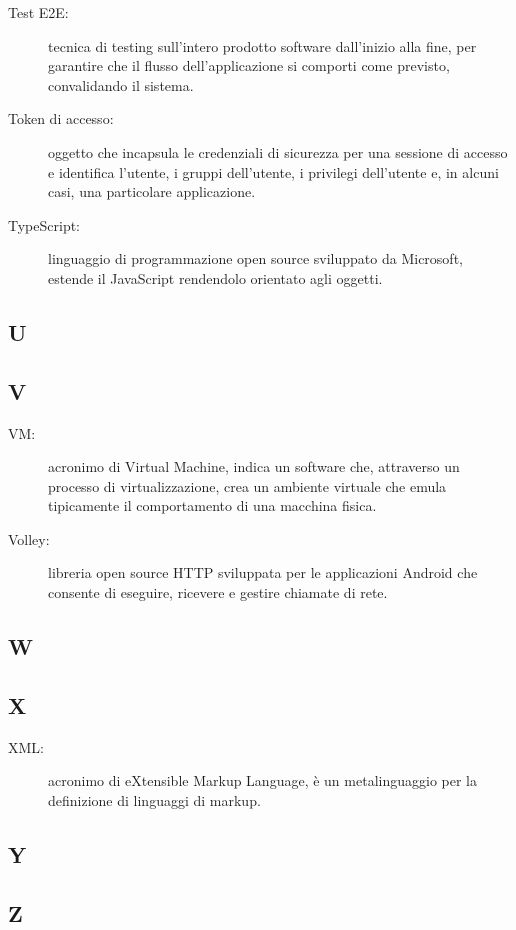 \documentclass[../manuale-manutentore.tex]{subfiles}
\begin{document}
\begin{description}
    \item[Test E2E:] tecnica di testing sull'intero prodotto software dall'inizio alla fine, per garantire che il flusso dell'applicazione si comporti come previsto, convalidando il sistema.
    \item[Token di accesso:] oggetto che incapsula le credenziali di sicurezza per una sessione di accesso e identifica l'utente, i gruppi dell'utente, i privilegi dell'utente e, in alcuni casi, una particolare applicazione.
    \item[TypeScript:] linguaggio di programmazione open source sviluppato da Microsoft, estende il JavaScript rendendolo orientato agli oggetti.
\end{description}

\subsection{U}

\subsection{V}

\begin{description}
    \item[VM:] acronimo di Virtual Machine, indica un software che, attraverso un processo di virtualizzazione, crea un ambiente virtuale che emula tipicamente il comportamento di una macchina fisica.
    \item[Volley:] libreria open source HTTP sviluppata per le applicazioni Android che consente di eseguire, ricevere e gestire chiamate di rete.
\end{description}

\subsection{W}

\subsection{X}
\begin{description}
    \item[XML:] acronimo di eXtensible Markup Language, è un metalinguaggio per la definizione di linguaggi di markup.
\end{description}

\subsection{Y}

\subsection{Z}
\end{document}

